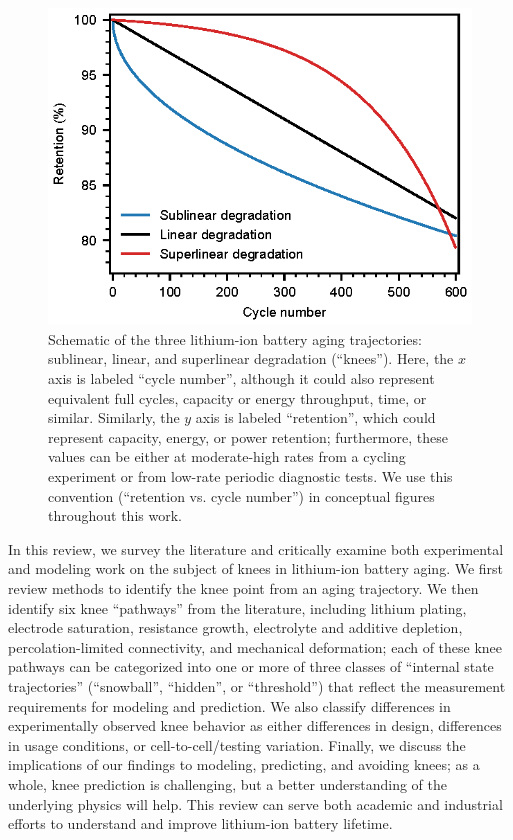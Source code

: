 \documentclass[journal=jpclcd,manuscript=article]{achemso}
\begin{document}
\begin{figure}[t]
\centering
\includegraphics[scale=1]{figures/degradation_rates.eps}
\caption{Schematic of the three lithium-ion battery aging trajectories: sublinear, linear, and superlinear degradation (``knees''). Here, the $x$ axis is labeled ``cycle number'', although it could also represent equivalent full cycles, capacity or energy throughput, time, or similar. Similarly, the $y$ axis is labeled ``retention'', which could represent capacity, energy, or power retention; furthermore, these values can be either at moderate-high rates from a cycling experiment or from low-rate periodic diagnostic tests. We use this convention (``retention vs. cycle number'') in conceptual figures throughout this work.}
\label{fig:degradation_shapes}
\end{figure}

In this review, we survey the literature and critically examine both experimental and modeling work on the subject of knees in lithium-ion battery aging. We first review methods to identify the knee point from an aging trajectory. We then identify six knee ``pathways'' from the literature, including lithium plating, electrode saturation, resistance growth, electrolyte and additive depletion, percolation-limited connectivity, and mechanical deformation; each of these knee pathways can be categorized into one or more of three classes of ``internal state trajectories'' (``snowball'', ``hidden'', or ``threshold'') that reflect the measurement requirements for modeling and prediction. We also classify differences in experimentally observed knee behavior as either differences in design, differences in usage conditions, or cell-to-cell/testing variation. Finally, we discuss the implications of our findings to modeling, predicting, and avoiding knees; as a whole, knee prediction is challenging, but a better understanding of the underlying physics will help. This review can serve both academic and industrial efforts to understand and improve lithium-ion battery lifetime.
\end{document}
